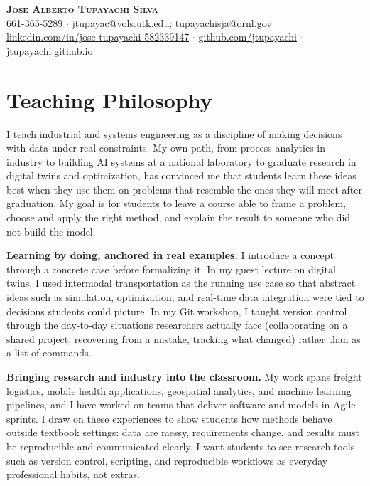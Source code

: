 \documentclass[10pt,letterpaper]{article}
\begin{document}
\begin{center}
{\LARGE\bfseries\textsc{Jose Alberto Tupayachi Silva}}\\[4pt]
{\small 661-365-5289 $\cdot$ \href{mailto:jtupayac@vols.utk.edu}{jtupayac@vols.utk.edu}; \href{mailto:tupayachisja@ornl.gov}{tupayachisja@ornl.gov}\\
\href{https://www.linkedin.com/in/jose-tupayachi-582339147}{linkedin.com/in/jose-tupayachi-582339147} $\cdot$ \href{https://github.com/jtupayachi}{github.com/jtupayachi} $\cdot$ \href{https://jtupayachi.github.io/}{jtupayachi.github.io}}
\end{center}

\section{Teaching Philosophy}

I teach industrial and systems engineering as a discipline of making decisions with data under real constraints. My own path, from process analytics in industry to building AI systems at a national laboratory to graduate research in digital twins and optimization, has convinced me that students learn these ideas best when they use them on problems that resemble the ones they will meet after graduation. My goal is for students to leave a course able to frame a problem, choose and apply the right method, and explain the result to someone who did not build the model.

\textbf{Learning by doing, anchored in real examples.} I introduce a concept through a concrete case before formalizing it. In my guest lecture on digital twins, I used intermodal transportation as the running use case so that abstract ideas such as simulation, optimization, and real-time data integration were tied to decisions students could picture. In my Git workshop, I taught version control through the day-to-day situations researchers actually face (collaborating on a shared project, recovering from a mistake, tracking what changed) rather than as a list of commands.

\textbf{Bringing research and industry into the classroom.} My work spans freight logistics, mobile health applications, geospatial analytics, and machine learning pipelines, and I have worked on teams that deliver software and models in Agile sprints. I draw on these experiences to show students how methods behave outside textbook settings: data are messy, requirements change, and results must be reproducible and communicated clearly. I want students to see research tools such as version control, scripting, and reproducible workflows as everyday professional habits, not extras.
\end{document}
